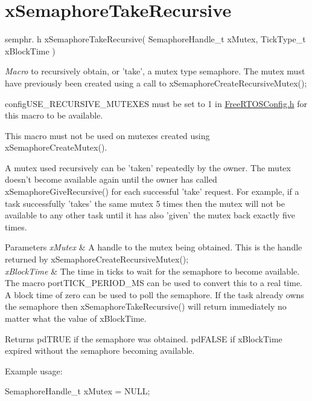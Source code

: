 \hypertarget{group__xSemaphoreTakeRecursive}{\section{x\-Semaphore\-Take\-Recursive}
\label{group__xSemaphoreTakeRecursive}
}
semphr. h x\-Semaphore\-Take\-Recursive( Semaphore\-Handle\-\_\-t x\-Mutex, Tick\-Type\-\_\-t x\-Block\-Time )

{\itshape Macro} to recursively obtain, or 'take', a mutex type semaphore. The mutex must have previously been created using a call to x\-Semaphore\-Create\-Recursive\-Mutex();

config\-U\-S\-E\-\_\-\-R\-E\-C\-U\-R\-S\-I\-V\-E\-\_\-\-M\-U\-T\-E\-X\-E\-S must be set to 1 in \hyperlink{FreeRTOSConfig_8h}{Free\-R\-T\-O\-S\-Config.\-h} for this macro to be available.

This macro must not be used on mutexes created using x\-Semaphore\-Create\-Mutex().

A mutex used recursively can be 'taken' repeatedly by the owner. The mutex doesn't become available again until the owner has called x\-Semaphore\-Give\-Recursive() for each successful 'take' request. For example, if a task successfully 'takes' the same mutex 5 times then the mutex will not be available to any other task until it has also 'given' the mutex back exactly five times.


\begin{DoxyParams}{Parameters}
{\em x\-Mutex} & A handle to the mutex being obtained. This is the handle returned by x\-Semaphore\-Create\-Recursive\-Mutex();\\
\hline
{\em x\-Block\-Time} & The time in ticks to wait for the semaphore to become available. The macro port\-T\-I\-C\-K\-\_\-\-P\-E\-R\-I\-O\-D\-\_\-\-M\-S can be used to convert this to a real time. A block time of zero can be used to poll the semaphore. If the task already owns the semaphore then x\-Semaphore\-Take\-Recursive() will return immediately no matter what the value of x\-Block\-Time.\\
\hline
\end{DoxyParams}
\begin{DoxyReturn}{Returns}
pd\-T\-R\-U\-E if the semaphore was obtained. pd\-F\-A\-L\-S\-E if x\-Block\-Time expired without the semaphore becoming available.
\end{DoxyReturn}
Example usage\-: 
\begin{DoxyPre}
 SemaphoreHandle\_t xMutex = NULL;\end{DoxyPre}



